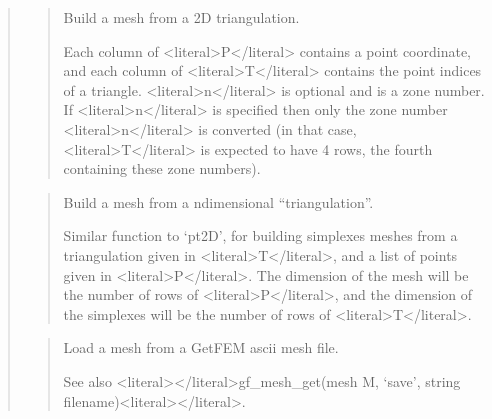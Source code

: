 \documentclass[a4paper,11pt,english]{sphinxmanual}
\begin{document}
\begin{quote}
\sphinxAtStartPar
{}
\begin{quote}

\sphinxAtStartPar
Build a mesh from a 2D triangulation.

\sphinxAtStartPar
Each column of \textless{}literal\textgreater{}P\textless{}/literal\textgreater{} contains a point coordinate, and each column of \textless{}literal\textgreater{}T\textless{}/literal\textgreater{}
contains the point indices of a triangle. \textless{}literal\textgreater{}n\textless{}/literal\textgreater{} is optional and is a
zone number. If \textless{}literal\textgreater{}n\textless{}/literal\textgreater{} is specified then only the zone number \textless{}literal\textgreater{}n\textless{}/literal\textgreater{} is
converted (in that case, \textless{}literal\textgreater{}T\textless{}/literal\textgreater{} is expected to have 4 rows, the fourth
containing these zone numbers).
\end{quote}

\sphinxAtStartPar
{}
\begin{quote}

\sphinxAtStartPar
Build a mesh from a n\sphinxhyphen{}dimensional “triangulation”.

\sphinxAtStartPar
Similar function to ‘pt2D’, for building simplexes meshes from a
triangulation given in \textless{}literal\textgreater{}T\textless{}/literal\textgreater{}, and a list of points given in \textless{}literal\textgreater{}P\textless{}/literal\textgreater{}. The
dimension of the mesh will be the number of rows of \textless{}literal\textgreater{}P\textless{}/literal\textgreater{}, and the
dimension of the simplexes will be the number of rows of \textless{}literal\textgreater{}T\textless{}/literal\textgreater{}.
\end{quote}

\sphinxAtStartPar
{}
\begin{quote}

\sphinxAtStartPar
Load a mesh from a GetFEM ascii mesh file.

\sphinxAtStartPar
See also \textless{}literal\textgreater{}\textless{}/literal\textgreater{}gf\_mesh\_get(mesh M, ‘save’, string filename)\textless{}literal\textgreater{}\textless{}/literal\textgreater{}.
\end{quote}


\end{quote}
\end{document}

